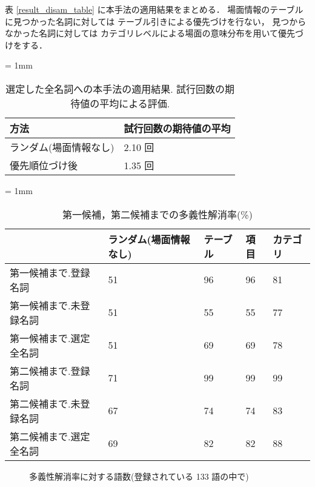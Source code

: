 表 \ref{result_disam_table} に本手法の適用結果をまとめる．
場面情報のテーブルに見つかった名詞に対しては
テーブル引きによる優先づけを行ない，
見つからなかった名詞に対しては
カテゴリレベルによる場面の意味分布を用いて優先づけをする．

\small
\begin{table}
  \caption{選定した全名詞への本手法の適用結果. 
           試行回数の期待値の平均による評価.}
  \label{result_table}
  \begin{center}
    \tabcolsep = 1mm
    \begin{tabular}{|l|l|} \hline
方法                   & 試行回数の期待値の平均 \\ \hline
ランダム(場面情報なし) & 2.10 回 \\
優先順位づけ後         & 1.35 回 \\ \hline
    \end{tabular}
  \end{center}
\end{table}
\normalsize

\small
\begin{table}
  \caption{第一候補，第二候補までの多義性解消率(\%)}
  \label{disam_prob}
  \begin{center}
    \tabcolsep = 1mm
    \begin{tabular}{|l|l|l|l|l|} \hline
        & ランダム(場面情報なし) & テーブル & 項目 & カテゴリ \\ \hline \hline
第一候補まで.登録名詞 & 51  & 96 & 96 & 81   \\
第一候補まで.未登録名詞 & 51 & 55 & 55 & 77 \\ \hline
第一候補まで.選定全名詞 & 51 & 69 & 69 & 78 \\ \hline \hline
第二候補まで.登録名詞 & 71 & 99 & 99 & 99 \\
第二候補まで.未登録名詞 & 67 & 74 & 74 & 83 \\ \hline
第二候補まで.選定全名詞 & 69 & 82 & 82 & 88 \\ \hline
    \end{tabular}
  \end{center}
\end{table}
\normalsize

\begin{figure}
  \begin{center}
  \end{center}
  \caption{多義性解消率に対する語数(登録されている 133 語の中で)}
  \label{disam1_registered}
\end{figure}

